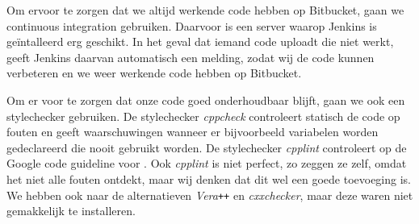 Om ervoor te zorgen dat we altijd werkende code hebben op Bitbucket, gaan we continuous integration gebruiken. Daarvoor is een server waarop Jenkins is ge\"intalleerd erg geschikt. In het geval dat iemand code uploadt die niet werkt, geeft Jenkins daarvan automatisch een melding, zodat wij de code kunnen verbeteren en we weer werkende code hebben op Bitbucket.  

Om er voor te zorgen dat onze code goed onderhoudbaar blijft, gaan we ook een stylechecker gebruiken. De stylechecker \emph{cppcheck} controleert statisch de code op fouten en geeft waarschuwingen wanneer er bijvoorbeeld variabelen worden gedeclareerd die nooit gebruikt worden. De stylechecker \emph{cpplint} controleert op de Google code guideline voor \cpp. Ook \emph{cpplint} is niet perfect, zo zeggen ze zelf, omdat het niet alle fouten ontdekt, maar wij denken dat dit wel een goede toevoeging is. We hebben ook naar de alternatieven \emph{Vera\texttt{++}} en \emph{cxxchecker}, maar deze waren niet gemakkelijk te installeren.
